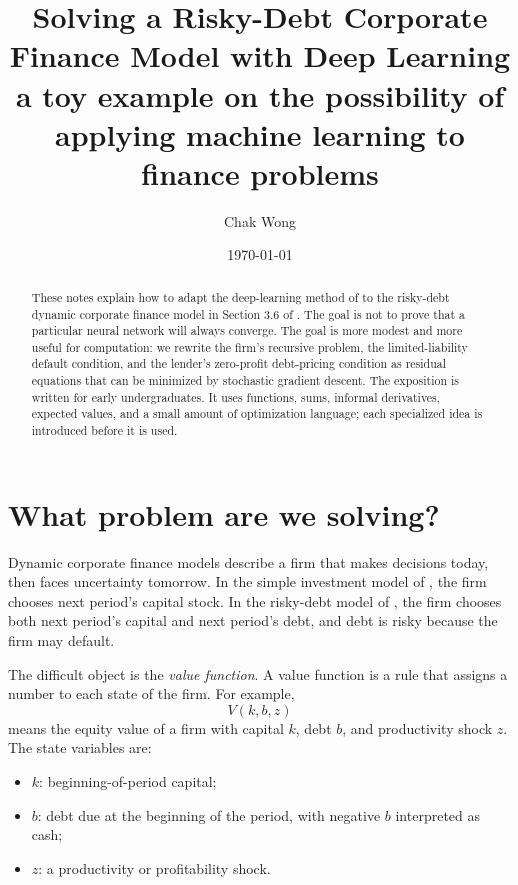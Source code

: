 \documentclass[11pt]{article}
\title{Solving a Risky-Debt Corporate Finance Model with Deep Learning\\
{\large a toy example on the possibility of applying machine learning to finance problems}}
\author{Chak Wong}
\date{\today}
\newcommand{\1}{\mathbf{1}}
\begin{document}
\maketitle

\begin{abstract}
These notes explain how to adapt the deep-learning method of
\citet{maliar2021deep} to the risky-debt dynamic corporate finance model in
Section 3.6 of \citet{strebulaev2012dynamic}. The goal is not to prove that a
particular neural network will always converge. The goal is more modest and
more useful for computation: we rewrite the firm's recursive problem, the
limited-liability default condition, and the lender's zero-profit debt-pricing
condition as residual equations that can be minimized by stochastic gradient
descent. The exposition is written for early undergraduates. It uses functions,
sums, informal derivatives, expected values, and a small amount of optimization
language; each specialized idea is introduced before it is used.
\end{abstract}

\tableofcontents

\section{What problem are we solving?}

Dynamic corporate finance models describe a firm that makes decisions today,
then faces uncertainty tomorrow. In the simple investment model of
\citet[Section 3.1]{strebulaev2012dynamic}, the firm chooses next period's
capital stock. In the risky-debt model of
\citet[Section 3.6]{strebulaev2012dynamic}, the firm chooses both next period's
capital and next period's debt, and debt is risky because the firm may default.

The difficult object is the \emph{value function}. A value function is a rule
that assigns a number to each state of the firm. For example,
\[
  V(k,b,z)
\]
means the equity value of a firm with capital \(k\), debt \(b\), and productivity
shock \(z\). The state variables are:
\begin{itemize}[leftmargin=2em]
  \item \(k\): beginning-of-period capital;
  \item \(b\): debt due at the beginning of the period, with negative \(b\)
  interpreted as cash;
  \item \(z\): a productivity or profitability shock.
\end{itemize}
\end{document}
